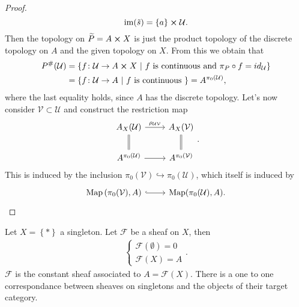 \documentclass[../Main]{subfiles}
\begin{document}
\begin{proof}
\begin{equation}
		\operatorname{im}(\tilde{s}) = \left\{ a \right\} \cross \mathcal{U}
	.\end{equation} 
	Then the topology on $\widetilde{P} = A \cross X$ is just
	the product topology of the discrete topology on $A$ and
	the given topology on $X$.
	From this we obtain that
	\begin{align}
		P^\#(\mathcal{U}) &= \left\{ f\colon \mathcal{U} \to A \cross X \ \middle|\ 
		f \text{ is continuous and } \pi_P \circ f = id_{\mathcal{U}}\right\} \\
				  &= \left\{ f\colon \mathcal{U} \to A \ \middle|\ 
				  f \text{ is continuous }\right\} = 
				  A^{\pi_0(\mathcal{U})}
	,\end{align} 
	where the last equality holds, since $A$ has the discrete topology.
	Let's now consider $\mathcal{V} \subset \mathcal{U}$ and construct the restriction map
	\begin{equation}
	\begin{tikzcd}
		A_X(\mathcal{U}) \arrow[r, "\rho_{\mathcal{UV}}", rightarrow] 
		\arrow[d, "", equals] &
		A_X(\mathcal{V}) \arrow[d, "", equals] \\
		A^{\pi_0(\mathcal{U})} \arrow[r, "", rightarrow] &
		A^{\pi_0(\mathcal{V})}
	\end{tikzcd}
	.\end{equation} 
	This is induced by the inclusion $\pi_0(\mathcal{V}) \hookrightarrow \pi_0(\mathcal{U})$,
	which itself is induced by 
	\begin{equation*}
		\begin{tikzcd}
			\mathrm{Map}\left( \pi_0(\mathcal{V}), A \right) \arrow[r, "", hookrightarrow] &
		\mathrm{Map}(\pi_0(\mathcal{U}), A).
		\end{tikzcd}\qedhere
	\end{equation*} 
\end{proof}

\begin{rem}[]
	Let $X = \left\{ * \right\}$ a singleton.
	Let $\mathcal{F}$ be a sheaf on $X$, then
	\begin{align}
		\begin{cases}
		\mathcal{F}(\emptyset) = 0\\
		\mathcal{F}(X) = A
		\end{cases} 
	.\end{align} 
	$\mathcal{F}$ is the constant sheaf associated to $A = \mathcal{F}(X)$.
	There is a one to one correspondance between sheaves on
	singletons and the objects of their target category.
\end{rem}
\end{document}
